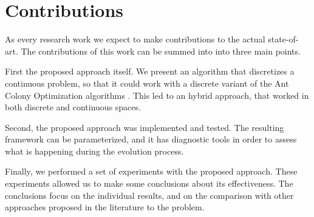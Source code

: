 \section{Contributions}

As every research work we expect to make contributions to the actual state-of-art. The contributions of this work can be summed into into three main points. 

First the proposed approach itself. We present an algorithm that discretizes a continuous problem, so that it could work with a discrete variant of the Ant Colony Optimization algorithms . This led to an hybrid approach, that worked in both discrete and continuous spaces.

Second, the proposed approach was implemented and tested. The resulting framework can be parameterized, and it has diagnostic tools in order to assess what is happening during the evolution process. 

Finally, we performed a set of experiments with the proposed approach. These experiments allowed us to make some conclusions about its effectiveness. The conclusions focus on the individual results, and on the comparison with other approaches proposed in the literature to the problem.



